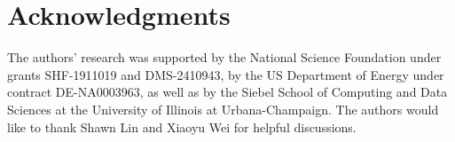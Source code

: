 \documentclass[12pt]{article}
\theoremstyle{definition}
\theoremstyle{plain}
\theoremstyle{definition}
\begin{document}
\section*{Acknowledgments}
The authors' research was supported by the National Science Foundation
under grants SHF-1911019 and DMS-2410943, by the US Department of Energy
under contract DE-NA0003963, as well as by the Siebel School of Computing
and Data Sciences at the University of Illinois at Urbana-Champaign.
The authors would like to thank Shawn Lin and Xiaoyu Wei for helpful discussions.

\end{document}
